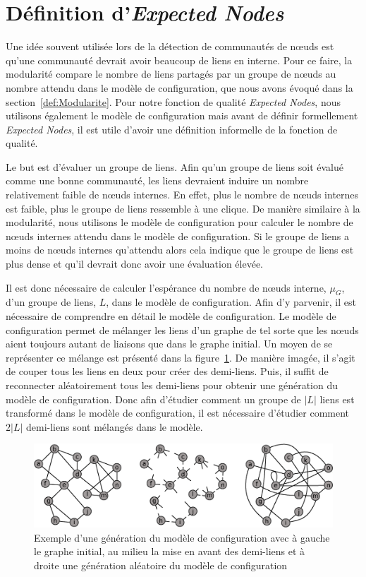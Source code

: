 \section{Définition d'\emph{Expected Nodes}}

Une idée souvent utilisée lors de la détection de communautés de n\oe{}uds est qu'une communauté devrait avoir beaucoup de liens en interne.
Pour ce faire, la modularité compare le nombre de liens partagés par un groupe de n\oe{}uds au nombre attendu dans le modèle de configuration, que nous avons évoqué dans la section~\ref{def:Modularite}.
Pour notre fonction de qualité \emph{Expected Nodes}, nous utilisons également le modèle de configuration mais avant de définir formellement \emph{Expected Nodes}, il est utile d'avoir une définition informelle de la fonction de qualité.

Le but est d'évaluer un groupe de liens.
Afin qu'un groupe de liens soit évalué comme une bonne communauté, les liens devraient induire un nombre relativement faible de n\oe{}uds internes.
En effet, plus le nombre de n\oe{}uds internes est faible, plus le groupe de liens ressemble à une clique.
De manière similaire à la modularité, nous utilisons le modèle de configuration pour calculer le nombre de n\oe{}uds internes attendu dans le modèle de configuration.
Si le groupe de liens a moins de n\oe{}uds internes qu'attendu alors cela indique que le groupe de liens est plus dense et qu'il devrait donc avoir une évaluation élevée.


Il est donc nécessaire de calculer l'espérance du nombre de n\oe{}uds interne, $\mu_{G}$, d'un groupe de liens, $L$, dans le modèle de configuration.
Afin d'y parvenir, il est nécessaire de comprendre en détail le modèle de configuration.
Le modèle de configuration permet de mélanger les liens d'un graphe de tel sorte que les n\oe{}uds aient toujours autant de liaisons que dans le graphe initial.
Un moyen de se représenter ce mélange est présenté dans la figure~\ref{fig:exemple_modele_configuration}.
De manière imagée, il s'agit de couper tous les liens en deux pour créer des demi-liens.
Puis, il suffit de reconnecter aléatoirement tous les demi-liens pour obtenir une génération du modèle de configuration.
Donc afin d'étudier comment un groupe de $|L|$ liens est transformé dans le modèle de configuration, il est nécessaire d'étudier comment $2|L|$ demi-liens sont mélangés dans le modèle.

\begin{figure}
\centering
\includegraphics[width=0.8\linewidth]{img/ExpectedNodes/Example/modele_configuration.eps}
\caption{Exemple d'une génération du modèle de configuration avec à gauche le graphe initial, au milieu la mise en avant des demi-liens et à droite une génération aléatoire du modèle de configuration}
\label{fig:exemple_modele_configuration}
\end{figure}


